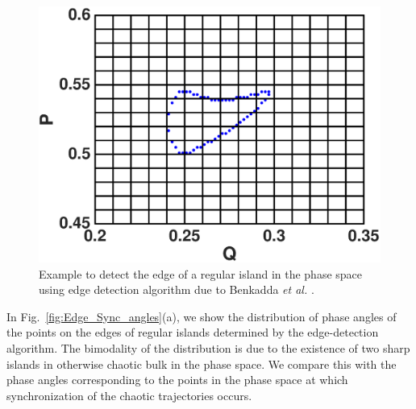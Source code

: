 \documentclass[reprint,amsmath,amssymb,aps,pre]{revtex4-1}
\begin{document}
\begin{figure}[b]
    \includegraphics[scale=0.42]{edge_reg_island.eps}
    \caption{\label{fig:edge_reg_island} \footnotesize Example to detect the 
    edge of a regular island in the phase space using edge detection 
    algorithm  due to Benkadda {\it et al.} \cite{Benkadda1997}. }
\end{figure}

In Fig.~\ref{fig:Edge_Sync_angles}(a), we show the distribution of phase angles of the points on the edges of regular islands determined by the edge-detection algorithm.  The bimodality of the distribution is due to the existence of two sharp islands in otherwise chaotic bulk in the phase space.  We compare this with the phase angles corresponding to the points in the phase space at which synchronization of the chaotic trajectories occurs.
\end{document}
